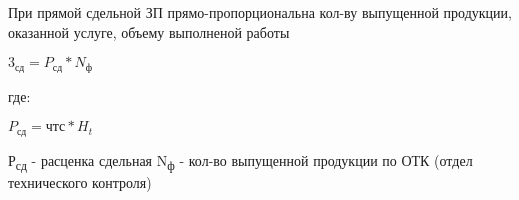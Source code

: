 \documentclass[11pt]{article}
\begin{document}
При прямой сдельной ЗП прямо-пропорциональна кол-ву выпущенной продукции, оказанной услуге, объему выполненой работы \\[0pt]

\newline


\begin{math}
3_{\text{сд}} = P_{\text{сд}} * N_{\text{ф}}
\end{math}

где:

\newline
\begin{math}
  P_{\text{сд}} = \text{чтс} * H_{t}
\end{math}
\newline\newline


Р\textsubscript{сд} - расценка сдельная
N\textsubscript{ф} - кол-во выпущенной продукции по ОТК (отдел технического контроля)
\end{document}
